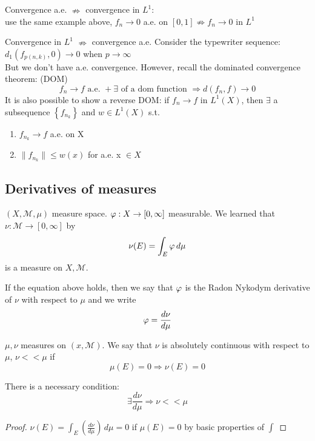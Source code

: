 Convergence a.e. \(\nRightarrow\) convergence in \(L^1\): \\
use the same example above, \(f_n \rightarrow 0\) a.e. on \([0, 1] \nRightarrow f_n \rightarrow 0\) in \(L^1\)

Convergence in \(L^1\) \(\nRightarrow\) convergence a.e.
Consider the typewriter sequence: \( d_1(f_{p(n, k)}, 0) \to 0\) when \( p \to\infty\) \\
But we don't have a.e. convergence. However, recall the dominated convergence theorem: (DOM)
\[ f_n \rightarrow f \text{ a.e. }  + \exists \text{ of a dom function } \Rightarrow d(f_n, f)\rightarrow 0 \]
It is also possible to show a reverse DOM:
if \(f_n \to f \) in \(L^1(X)\), then \(\exists\) a subsequence \(\left\{f_{n_k}\right\}\) and \(w \in L^1(X)\) s.t. 
\begin{enumerate}
    \item \(f_{n_k} \rightarrow f\) a.e. on X
    \item \(\| f_{n_k} \| \leq w(x) \) for a.e. x \(\in X\)
\end{enumerate}

\subsection*{Derivatives of measures}
\(\left(X, \mathcal{M}, \mu \right)\) measure space. 
\(\oldphi : X \to \left[0, \infty \right]\) measurable. 
We learned that \(\nu: \mathcal{M} \to \left[0, \infty \right]\) by \[\nu(E)= \int_E \oldphi \, d\mu\] is a measure on \(X, \mathcal{M}\).

If the equation above holds, then we say that \(\oldphi \) is the Radon Nykodym derivative of \(\nu\) with respect to \(\mu\) and we write \[\oldphi = \frac{d\nu}{d\mu}\]
\begin{definition}
    \(\mu, \nu  \) measures on \(\left(x, \mathcal{M}\right)\). We say that \(\nu\) is absolutely continuous with respect to \(\mu\), \(\nu << \mu \) if 
    \[\mu(E) = 0 \Rightarrow \nu(E)=0\]
\end{definition}

\begin{lemma}
    There is a necessary condition:
    \[ \exists \frac{d \nu}{d \mu} \Rightarrow \nu << \mu \]
\end{lemma}

\begin{proof}
    \(\nu(E) = \int_E (\frac{d\nu}{d\mu}) \, d\mu = 0\) if \(\mu(E)=0\) by basic properties of \(\int\)
\end{proof}

